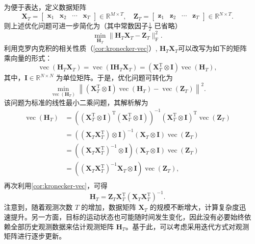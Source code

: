 为便于表达，定义数据矩阵
\[
    \mathbf{X}_T = \begin{bmatrix} \bm{x}_1 & \bm{x}_2 & \cdots & \bm{x}_T \end{bmatrix} \in \mathbb{R}^{M \times T},
    \quad
    \mathbf{Z}_T = \begin{bmatrix} \bm{z}_1 & \bm{z}_2 & \cdots & \bm{z}_T \end{bmatrix} \in \mathbb{R}^{N \times T}.
\]
则上述优化问题可进一步简化为（其中常数因子\( \frac{1}{T} \) 已省略）
\[
    \min_{\mathbf{H}_T} \big\| \mathbf{H}_T \mathbf{X}_T - \mathbf{Z}_T \big\|_{\mathrm{F}}^2.
\]
利用克罗内克积的相关性质（\cref{cor:kronecker-vec}）, \( \mathbf{H}_T \mathbf{X}_T \)可以改写为如下的矩阵乘向量的形式：
\[
    \operatorname{vec}(\mathbf{H}_T \mathbf{X}_T) = \operatorname{vec}(\mathbf{I} \mathbf{H}_T \mathbf{X}_T)  = (\mathbf{X}_T^{\mathrm{T}} \otimes \mathbf{I}) \operatorname{vec}(\mathbf{H}_T),
\]
其中，\( \mathbf{I} \in \mathbb{R}^{N \times N} \) 为单位矩阵。于是，优化问题可转化为
\[
    \min_{\operatorname{vec}(\mathbf{H}_T)} \left\| (\mathbf{X}_T^{\mathrm{T}} \otimes \mathbf{I}) \operatorname{vec}(\mathbf{H}_T) - \operatorname{vec}(\mathbf{Z}_T) \right\|^2.
\]
该问题为标准的线性最小二乘问题，其解析解为
\[
    \begin{split}
        \operatorname{vec}(\mathbf{H}_T) & = \left( (\mathbf{X}_T^{\mathrm{T}} \otimes \mathbf{I})^{\mathrm{T}} (\mathbf{X}_T^{\mathrm{T}} \otimes \mathbf{I}) \right)^{-1} (\mathbf{X}_T^{\mathrm{T}} \otimes \mathbf{I})^{\mathrm{T}} \operatorname{vec}(\mathbf{Z}_T ) \\
                                         & = \left( \left( \mathbf{X}_T \mathbf{X}_T^{\mathrm{T}} \right)\otimes \mathbf{I} \right)^{-1} (\mathbf{X}_T \otimes \mathbf{I}) \operatorname{vec}(\mathbf{Z}_T)                                                               \\
                                         & = \left( \left( \mathbf{X}_T \mathbf{X}_T^{\mathrm{T}} \right)^{-1} \otimes \mathbf{I} \right) (\mathbf{X}_T \otimes \mathbf{I}) \operatorname{vec}(\mathbf{Z}_T)                                                              \\
                                         & = \left( \left( \mathbf{X}_T \mathbf{X}_T^{\mathrm{T}} \right)^{-1} \mathbf{X}_T \otimes \mathbf{I} \right) \operatorname{vec}(\mathbf{Z}_T),                                                                                  \\
    \end{split}
\]
再次利用\cref{cor:kronecker-vec}，可得
\[
    \mathbf{H}_T = \mathbf{Z}_T \mathbf{X}_T^{\mathrm{T}} \left( \mathbf{X}_T \mathbf{X}_T^{\mathrm{T}} \right)^{-1}.
\]
注意到，随着观测次数 \(T\) 的增加，数据矩阵 \(\mathbf{X}_T\) 的规模不断增大，计算复杂度迅速提升。另一方面，目标的运动状态也可能随时间发生变化，因此没有必要始终依赖全部历史观测数据来估计观测矩阵 \(\mathbf{H}_T\)。基于此，可以考虑采用迭代方式对观测矩阵进行逐步更新。

